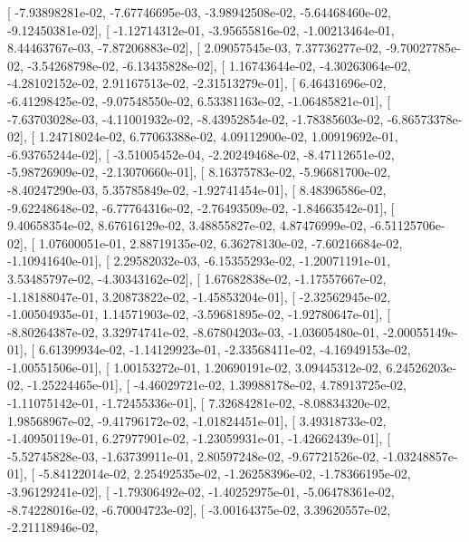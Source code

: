 \documentclass{article}
\begin{document}
       [ -7.93898281e-02,  -7.67746695e-03,  -3.98942508e-02,
         -5.64468460e-02,  -9.12450381e-02],
       [ -1.12714312e-01,  -3.95655816e-02,  -1.00213464e-01,
          8.44463767e-03,  -7.87206883e-02],
       [  2.09057545e-03,   7.37736277e-02,  -9.70027785e-02,
         -3.54268798e-02,  -6.13435828e-02],
       [  1.16743644e-02,  -4.30263064e-02,  -4.28102152e-02,
          2.91167513e-02,  -2.31513279e-01],
       [  6.46431696e-02,  -6.41298425e-02,  -9.07548550e-02,
          6.53381163e-02,  -1.06485821e-01],
       [ -7.63703028e-03,  -4.11001932e-02,  -8.43952854e-02,
         -1.78385603e-02,  -6.86573378e-02],
       [  1.24718024e-02,   6.77063388e-02,   4.09112900e-02,
          1.00919692e-01,  -6.93765244e-02],
       [ -3.51005452e-04,  -2.20249468e-02,  -8.47112651e-02,
         -5.98726909e-02,  -2.13070660e-01],
       [  8.16375783e-02,  -5.96681700e-02,  -8.40247290e-03,
          5.35785849e-02,  -1.92741454e-01],
       [  8.48396586e-02,  -9.62248648e-02,  -6.77764316e-02,
         -2.76493509e-02,  -1.84663542e-01],
       [  9.40658354e-02,   8.67616129e-02,   3.48855827e-02,
          4.87476999e-02,  -6.51125706e-02],
       [  1.07600051e-01,   2.88719135e-02,   6.36278130e-02,
         -7.60216684e-02,  -1.10941640e-01],
       [  2.29582032e-03,  -6.15355293e-02,  -1.20071191e-01,
          3.53485797e-02,  -4.30343162e-02],
       [  1.67682838e-02,  -1.17557667e-02,  -1.18188047e-01,
          3.20873822e-02,  -1.45853204e-01],
       [ -2.32562945e-02,  -1.00504935e-01,   1.14571903e-02,
         -3.59681895e-02,  -1.92780647e-01],
       [ -8.80264387e-02,   3.32974741e-02,  -8.67804203e-03,
         -1.03605480e-01,  -2.00055149e-01],
       [  6.61399934e-02,  -1.14129923e-01,  -2.33568411e-02,
         -4.16949153e-02,  -1.00551506e-01],
       [  1.00153272e-01,   1.20690191e-02,   3.09445312e-02,
          6.24526203e-02,  -1.25224465e-01],
       [ -4.46029721e-02,   1.39988178e-02,   4.78913725e-02,
         -1.11075142e-01,  -1.72455336e-01],
       [  7.32684281e-02,  -8.08834320e-02,   1.98568967e-02,
         -9.41796172e-02,  -1.01824451e-01],
       [  3.49318733e-02,  -1.40950119e-01,   6.27977901e-02,
         -1.23059931e-01,  -1.42662439e-01],
       [ -5.52745828e-03,  -1.63739911e-01,   2.80597248e-02,
         -9.67721526e-02,  -1.03248857e-01],
       [ -5.84122014e-02,   2.25492535e-02,  -1.26258396e-02,
         -1.78366195e-02,  -3.96129241e-02],
       [ -1.79306492e-02,  -1.40252975e-01,  -5.06478361e-02,
         -8.74228016e-02,  -6.70004723e-02],
       [ -3.00164375e-02,   3.39620557e-02,  -2.21118946e-02,
\end{document}
